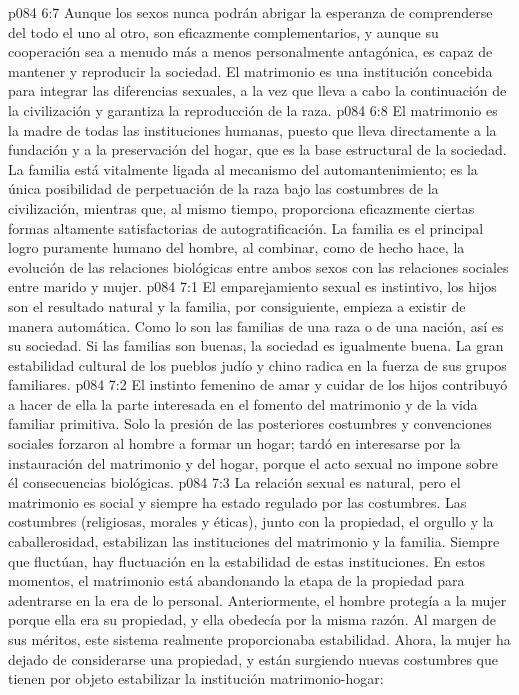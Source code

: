 \vs p084 6:7 \pc Aunque los sexos nunca podrán abrigar la esperanza de comprenderse del todo el uno al otro, son eficazmente complementarios, y aunque su cooperación sea a menudo más a menos personalmente antagónica, es capaz de mantener y reproducir la sociedad. El matrimonio es una institución concebida para integrar las diferencias sexuales, a la vez que lleva a cabo la continuación de la civilización y garantiza la reproducción de la raza.
\vs p084 6:8 El matrimonio es la madre de todas las instituciones humanas, puesto que lleva directamente a la fundación y a la preservación del hogar, que es la base estructural de la sociedad. La familia está vitalmente ligada al mecanismo del automantenimiento; es la única posibilidad de perpetuación de la raza bajo las costumbres de la civilización, mientras que, al mismo tiempo, proporciona eficazmente ciertas formas altamente satisfactorias de autogratificación. La familia es el principal logro puramente humano del hombre, al combinar, como de hecho hace, la evolución de las relaciones biológicas entre ambos sexos con las relaciones sociales entre marido y mujer.
\vs p084 7:1 El emparejamiento sexual es instintivo, los hijos son el resultado natural y la familia, por consiguiente, empieza a existir de manera automática. Como lo son las familias de una raza o de una nación, así es su sociedad. Si las familias son buenas, la sociedad es igualmente buena. La gran estabilidad cultural de los pueblos judío y chino radica en la fuerza de sus grupos familiares.
\vs p084 7:2 El instinto femenino de amar y cuidar de los hijos contribuyó a hacer de ella la parte interesada en el fomento del matrimonio y de la vida familiar primitiva. Solo la presión de las posteriores costumbres y convenciones sociales forzaron al hombre a formar un hogar; tardó en interesarse por la instauración del matrimonio y del hogar, porque el acto sexual no impone sobre él consecuencias biológicas.
\vs p084 7:3 La relación sexual es natural, pero el matrimonio es social y siempre ha estado regulado por las costumbres. Las costumbres (religiosas, morales y éticas), junto con la propiedad, el orgullo y la caballerosidad, estabilizan las instituciones del matrimonio y la familia. Siempre que fluctúan, hay fluctuación en la estabilidad de estas instituciones. En estos momentos, el matrimonio está abandonando la etapa de la propiedad para adentrarse en la era de lo personal. Anteriormente, el hombre protegía a la mujer porque ella era su propiedad, y ella obedecía por la misma razón. Al margen de sus méritos, este sistema realmente proporcionaba estabilidad. Ahora, la mujer ha dejado de considerarse una propiedad, y están surgiendo nuevas costumbres que tienen por objeto estabilizar la institución matrimonio\hyp{}hogar:
